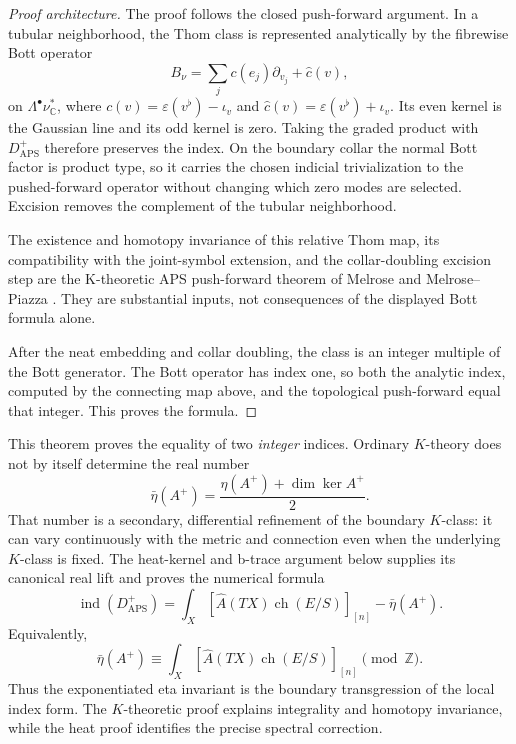 \documentclass[12pt,oneside,reqno]{article}
\theoremstyle{plain}
\theoremstyle{definition}
\theoremstyle{remark}
\begin{document}
\begin{proof}[Proof architecture]
The proof follows the closed push-forward argument. In a tubular
neighborhood, the Thom class is represented analytically by the
fibrewise Bott operator
\[
 B_\nu=\sum_j c(e_j)\partial_{v_j}+\widehat c(v),
\]
on \(\Lambda^\bullet\nu_\mathbb C^*\), where
\(c(v)=\varepsilon(v^\flat)-\iota_v\) and
\(\widehat c(v)=\varepsilon(v^\flat)+\iota_v\).
Its even kernel is the Gaussian line and its odd kernel is zero.
Taking the graded product with \(D^+_{\mathrm{APS}}\) therefore preserves
the index. On the boundary collar the normal Bott factor is product type,
so it carries the chosen indicial trivialization to the pushed-forward
operator without changing which zero modes are selected. Excision removes
the complement of the tubular neighborhood.

The existence and homotopy invariance of this relative Thom map, its
compatibility with the joint-symbol extension, and the collar-doubling
excision step are the K-theoretic APS push-forward theorem of Melrose and
Melrose--Piazza \cite{Melrose,MelrosePiazza}. They are substantial inputs,
not consequences of the displayed Bott formula alone.

After the neat embedding and collar doubling, the class is an integer
multiple of the Bott generator. The Bott operator has index one, so both
the analytic index, computed by the connecting map above, and the
topological push-forward equal that integer. This proves the formula.
\end{proof}

This theorem proves the equality of two \emph{integer} indices. Ordinary
\(K\)-theory does not by itself determine the real number
\[
 \bar\eta(A^+)=\frac{\eta(A^+)+\dim\ker A^+}{2}.
\]
That number is a secondary, differential refinement of the boundary
\(K\)-class: it can vary continuously with the metric and connection even
when the underlying \(K\)-class is fixed. The heat-kernel and b-trace
argument below supplies its canonical real lift and proves the numerical
formula
\[
 \operatorname{ind}(D^+_{\mathrm{APS}})
 =
 \int_X
 \left[\widehat A(TX)\operatorname{ch}(E/S)\right]_{[n]}
 -\bar\eta(A^+).
\]
Equivalently,
\[
 \bar\eta(A^+)\equiv
 \int_X
 \left[\widehat A(TX)\operatorname{ch}(E/S)\right]_{[n]}
 \pmod{\mathbb Z}.
\]
Thus the exponentiated eta invariant is the boundary transgression of the
local index form. The \(K\)-theoretic
proof explains integrality and homotopy invariance, while the heat proof
identifies the precise spectral correction.
\end{document}
